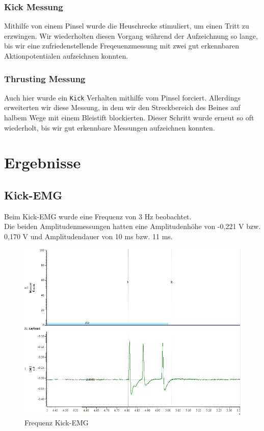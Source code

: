 \documentclass[a4paper]{article}
\begin{document}
\subsubsection{Kick Messung}
Mithilfe von einem Pinsel wurde die Heuschrecke stimuliert, um einen Tritt zu erzwingen. Wir wiederholten diesen Vorgang während der Aufzeichnung so lange, bis wir eine zufriedenstellende Freqeuenzmessung mit zwei gut erkennbaren Aktionpotentialen aufzeichnen konnten. 

\subsubsection{Thrusting Messung}
Auch hier wurde ein \texttt{Kick} Verhalten mithilfe vom Pinsel forciert. Allerdings erweiterten wir diese Messung, in dem wir den Streckbereich des Beines auf halbem Wege mit einem Bleistift blockierten. Dieser Schritt wurde erneut so oft wiederholt, bis wir gut erkennbare Messungen aufzeichnen konnten.

\section{Ergebnisse}

\subsection{Kick-EMG}

Beim Kick-EMG wurde eine Frequenz von 3 Hz beobachtet. \\
Die beiden Amplitudenmessungen hatten eine Amplitudenhöhe von -0,221 V bzw. 0,170 V und Amplitudendauer von 10 ms bzw. 11 ms.

\vspace{2.5\baselineskip}
\begin{figure}[H]
    \centering
        \includegraphics[scale=0.5]{images/kick_freq.png}
    \caption{Frequenz Kick-EMG}
\end{figure}
\end{document}
